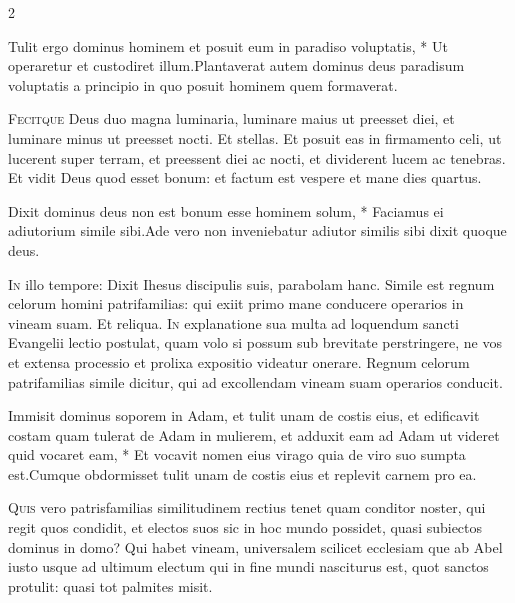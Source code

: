 \begin{multicols*}{2}
\begin{responsory}
{Tulit ergo dominus hominem et posuit eum in paradiso voluptatis, * Ut operaretur et custodiret illum.}{Plantaverat autem dominus deus paradisum voluptatis a principio in quo posuit hominem quem formaverat.}
\end{responsory}%
\lettrine[lines=2]{\zallmancaps \color{Blue} F}{ecitque} Deus duo magna luminaria, luminare maius ut preesset diei, et luminare minus ut preesset nocti. Et stellas. Et posuit eas in firmamento celi, ut lucerent super terram, et preessent diei ac nocti, et dividerent lucem ac tenebras. Et vidit Deus quod esset bonum: et factum est vespere et mane dies quartus.
\begin{responsory-doxology}
{Dixit dominus deus non est bonum esse hominem solum, * Faciamus ei adiutorium simile sibi.}{Ade vero non inveniebatur adiutor similis sibi dixit quoque deus.}
\end{responsory-doxology}%
\lettrine[lines=2]{\zallmancaps \color{Red} I}{n} illo tempore: Dixit Ihesus discipulis suis, parabolam hanc. Simile est regnum celorum homini patrifamilias: qui exiit primo mane conducere operarios in vineam suam. Et reliqua.
\lettrine[lines=2]{\zallmancaps \color{Blue} I}{n} explanatione sua multa ad loquendum sancti Evangelii lectio postulat, quam volo si possum sub brevitate perstringere, ne vos et extensa processio et prolixa expositio videatur onerare. Regnum celorum patrifamilias simile dicitur, qui ad excollendam vineam suam operarios conducit.
\begin{responsory}
{Immisit dominus soporem in Adam, et tulit unam de costis eius, et edificavit costam quam tulerat de Adam in mulierem, et adduxit eam ad Adam ut videret quid vocaret eam, * Et vocavit nomen eius virago quia de viro suo sumpta est.}{Cumque obdormisset tulit unam de costis eius et replevit carnem pro ea.}
\end{responsory}%
\lettrine[lines=2]{\zallmancaps \color{Red} Q}{uis} vero patrisfamilias similitudinem rectius tenet quam conditor noster, qui regit quos condidit, et electos suos sic in hoc mundo possidet, quasi subiectos dominus in domo? Qui habet vineam, universalem scilicet ecclesiam que ab Abel iusto usque ad ultimum electum qui in fine mundi nasciturus est, quot sanctos protulit: quasi tot palmites misit.

\end{multicols*}
